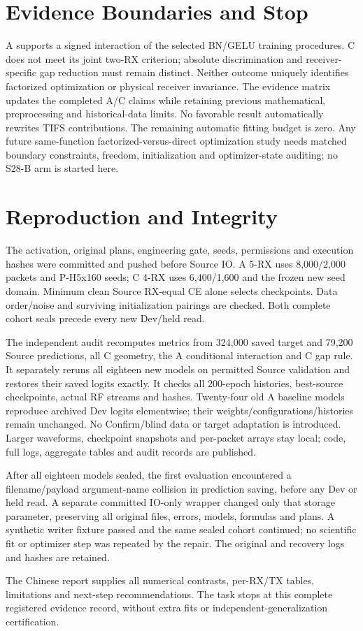 \documentclass[10pt]{article}
\begin{document}
\section{Evidence Boundaries and Stop}
A supports a signed interaction of the selected BN/GELU training procedures.
C does not meet its joint two-RX criterion; absolute discrimination and receiver-specific gap reduction must remain distinct.
Neither outcome uniquely identifies factorized optimization or physical receiver invariance. The evidence matrix updates the completed A/C claims while retaining previous mathematical, preprocessing and historical-data limits. No favorable result automatically rewrites TIFS contributions. The remaining automatic fitting budget is zero. Any future same-function factorized-versus-direct optimization study needs matched boundary constraints, freedom, initialization and optimizer-state auditing; no S28-B arm is started here.
\section{Reproduction and Integrity}
The activation, original plans, engineering gate, seeds, permissions and execution hashes were committed and pushed before Source IO. A 5-RX uses 8,000/2,000 packets and P-H5x160 seeds; C 4-RX uses 6,400/1,600 and the frozen new seed domain. Minimum clean Source RX-equal CE alone selects checkpoints. Data order/noise and surviving initialization pairings are checked. Both complete cohort seals precede every new Dev/held read.

The independent audit recomputes metrics from 324,000 saved target and 79,200 Source predictions, all C geometry, the A conditional interaction and C gap rule. It separately reruns all eighteen new models on permitted Source validation and restores their saved logits exactly. It checks all 200-epoch histories, best-source checkpoints, actual RF streams and hashes. Twenty-four old A baseline models reproduce archived Dev logits elementwise; their weights/configurations/histories remain unchanged. No Confirm/blind data or target adaptation is introduced. Larger waveforms, checkpoint snapshots and per-packet arrays stay local; code, full logs, aggregate tables and audit records are published.

After all eighteen models sealed, the first evaluation encountered a filename/payload argument-name collision in prediction saving, before any Dev or held read. A separate committed IO-only wrapper changed only that storage parameter, preserving all original files, errors, models, formulas and plans. A synthetic writer fixture passed and the same sealed cohort continued; no scientific fit or optimizer step was repeated by the repair. The original and recovery logs and hashes are retained.

The Chinese report supplies all numerical contrasts, per-RX/TX tables, limitations and next-step recommendations. The task stops at this complete registered evidence record, without extra fits or independent-generalization certification.
\end{document}

